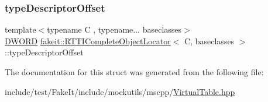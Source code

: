 \subsubsection{\texorpdfstring{typeDescriptorOffset}{typeDescriptorOffset}}
{\footnotesize\ttfamily template$<$typename C , typename... baseclasses$>$ \\
\mbox{\hyperlink{namespacefakeit_a3d9fcff73186d3a22472ec6156db1f10}{D\+W\+O\+RD}} \mbox{\hyperlink{structfakeit_1_1RTTICompleteObjectLocator}{fakeit\+::\+R\+T\+T\+I\+Complete\+Object\+Locator}}$<$ C, baseclasses $>$\+::type\+Descriptor\+Offset}



The documentation for this struct was generated from the following file\+:\begin{DoxyCompactItemize}
\item 
include/test/\+Fake\+It/include/mockutils/mscpp/\mbox{\hyperlink{mscpp_2VirtualTable_8hpp}{Virtual\+Table.\+hpp}}\end{DoxyCompactItemize}
